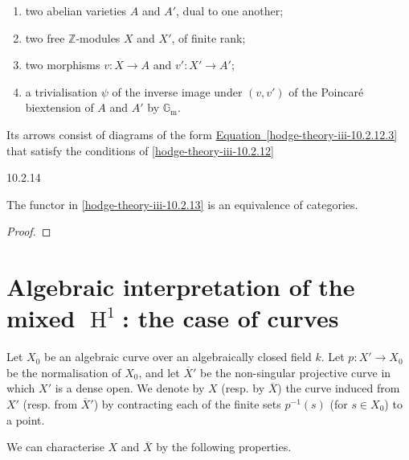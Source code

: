    
 \begin{enumerate}
      
 \item[(a)]
        two abelian varieties \(A\) and \(A'\), dual to one another;
      

      
 \item[(b)]
        two free \(\mathbb {Z}\)-modules \(X\) and \(X'\), of finite rank;
      

      
 \item[(c)]
        two morphisms \(v\colon  X\to  A\) and \(v'\colon  X'\to  A'\);
      

      
 \item[(d)]
        a trivialisation \(\psi \) of the inverse image under \((v,v')\) of the Poincaré biextension of \(A\) and \(A'\) by \(\mathbb {G}_\mathrm {m}\).
      

    \end{enumerate}\par{}Its arrows consist of diagrams of the form \hyperref[hodge-theory-iii-10.2.12.3]{Equation~\ref*{hodge-theory-iii-10.2.12.3}} that satisfy the conditions of \cref{hodge-theory-iii-10.2.12}\begin{proposition}{10.2.14}\label{hodge-theory-iii-10.2.14}\skipsinglepar\par{}The functor in \cref{hodge-theory-iii-10.2.13} is an equivalence of categories.\begin{proof}\end{proof}\end{proposition}\section{Algebraic interpretation of the mixed \(\operatorname {H}^1\): the case of curves}\label{hodge-theory-iii-10.3}\label{hodge-theory-iii-10.3.1}\par{}Let \(X_0\) be an algebraic curve over an algebraically closed field \(k\).
    Let \(p\colon  X'\to  X_0\) be the normalisation of \(X_0\), and let \(\overline {X}'\) be the non-singular projective curve in which \(X'\) is a dense open.
    We denote by \(X\) (resp. by \(\overline {X}\)) the curve induced from \(X'\) (resp. from \(\overline {X}'\)) by contracting each of the finite sets \(p^{-1}(s)\) (for \(s\in  X_0\)) to a point.

    
  \par{}We can characterise \(X\) and \(\overline {X}\) by the following properties.


